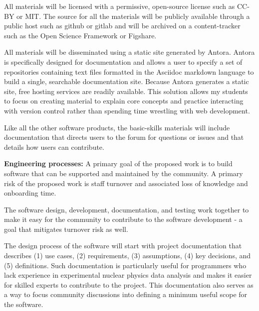 All materials will be licensed with  a permissive, open-source license such as CC-BY or MIT.  The source for all the materials will be publicly available through a public host such as github or gitlab and will be archived on a content-tracker such as the Open Science Framework or Figshare.

All materials will be disseminated using a static site generated by Antora.  Antora is specifically designed for documentation and allows a user to specify a set of repositories containing text files formatted in the Asciidoc markdown language to build a single, searchable documentation site.  Because Antora generates a static site, free hosting services are readily available.  This solution allows my students to focus on creating material to explain core concepts and practice interacting with version control rather than spending time wrestling with web development.


Like all the other software products, the basic-skills materials  will include documentation that directs users to the forum for questions or issues and  that details how users can contribute. 


\textbf{Engineering processes:}
A primary goal of the proposed work is to build software that can be supported and maintained by the community.  A primary risk of the proposed work is staff turnover and associated loss of knowledge and onboarding time.

The software design, development, documentation, and testing work together to make it easy for the community to contribute to the software development - a goal that mitigates turnover risk as well.

The design process of the software will start with project documentation that describes (1) use cases, (2) requirements, (3) assumptions, (4) key decisions, and (5) definitions.  Such documentation is particularly useful for programmers who lack experience in experimental nuclear physics data analysis and makes it easier for skilled experts to contribute to the project.  This documentation also serves as a way to focus community discussions into defining a minimum useful scope for the software.

